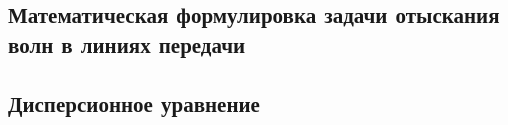 \subsection{Математическая формулировка задачи отыскания волн в линиях передачи}

\subsection{Дисперсионное уравнение}